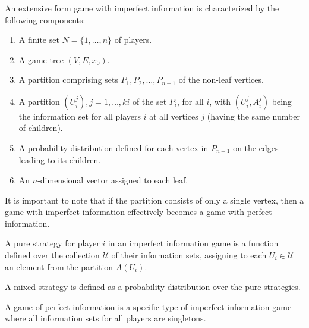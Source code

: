 \begin{definition}
    An extensive form game with imperfect information is characterized by the following components:
    \begin{enumerate}
        \item A finite set $N = \{1, \dots, n\}$ of players. 
        \item A game tree $(V, E, x_0)$. 
        \item A partition comprising sets $P_1, P_2, \dots, P_{n+1}$ of the non-leaf vertices.
        \item A partition $(U^j_i), j = 1, \dots, ki$ of the set $P_i$, for all $i$, with $(U^j_i, A^j_i)$ being the information set for all players $i$ at all vertices $j$ (having the same number of children). 
        \item A probability distribution defined for each vertex in $P_{n+1}$ on the edges leading to its children.
        \item An $n$-dimensional vector assigned to each leaf.
    \end{enumerate}
\end{definition}
\noindent It is important to note that if the partition consists of only a single vertex, then a game with imperfect information effectively becomes a game with perfect information.
\begin{definition}
    A pure strategy for player $i$ in an imperfect information game is a function defined over the collection $\mathcal{U}$ of their information sets, assigning to each $U_i\in\mathcal{U}$ an element from the partition $A(U_i)$. 
\end{definition}
\begin{definition}
    A mixed strategy is defined as a probability distribution over the pure strategies.
\end{definition}
\noindent A game of perfect information is a specific type of imperfect information game where all information sets for all players are singletons.